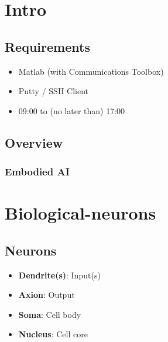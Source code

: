 \documentclass[
    fontsize      = 11pt,
    paper         = a4,
    twoside       = false,
    parskip       = half,
    pagesize      = false,
]{scrartcl}
\author{Robin Prillwitz}
\date{17 August 2022}
\providecommand{\tightlist}{%
  \setlength{\itemsep}{0pt}\setlength{\parskip}{0pt}}
\begin{document}
\tableofcontents

\clearpage
\newpage

\hypertarget{intro}{%
\section{Intro}\label{intro}}

\hypertarget{requirements}{%
\subsection{Requirements}\label{requirements}}

\begin{itemize}
\tightlist
\item
  Matlab (with Communications Toolbox)
\item
  Putty / SSH Client
\item
  09:00 to (no later than) 17:00
\end{itemize}

\hypertarget{overview}{%
\subsection{Overview}\label{overview}}

\hypertarget{embodied-ai}{%
\subsubsection{Embodied AI}\label{embodied-ai}}

\clearpage
\newpage

\hypertarget{biological-neurons}{%
\section{Biological-neurons}\label{biological-neurons}}

\hypertarget{neurons}{%
\subsection{Neurons}\label{neurons}}

\begin{itemize}
\tightlist
\item
  \textbf{Dendrite(s)}: Input(s)
\item
  \textbf{Axion}: Output
\item
  \textbf{Soma}: Cell body
\item
  \textbf{Nucleus}: Cell core
\end{itemize}
\end{document}
